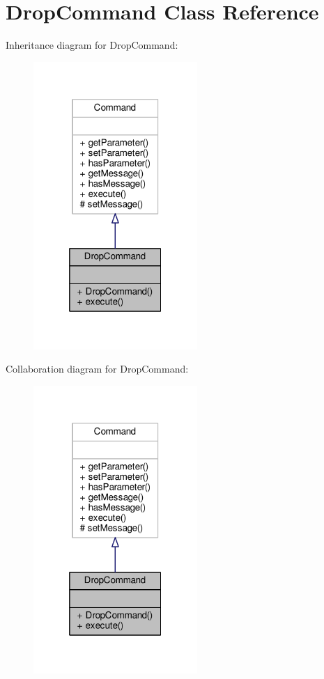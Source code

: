 \hypertarget{classDropCommand}{\section{Drop\-Command Class Reference}
\label{classDropCommand}
}


Inheritance diagram for Drop\-Command\-:
\nopagebreak
\begin{figure}[H]
\begin{center}
\leavevmode
\includegraphics[width=176pt]{classDropCommand__inherit__graph}
\end{center}
\end{figure}


Collaboration diagram for Drop\-Command\-:
\nopagebreak
\begin{figure}[H]
\begin{center}
\leavevmode
\includegraphics[width=176pt]{classDropCommand__coll__graph}
\end{center}
\end{figure}
